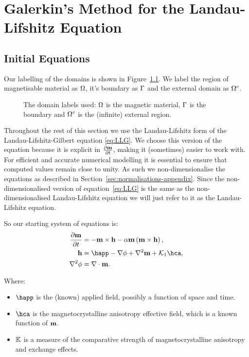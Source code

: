 
\chapter{Galerkin's Method for the Landau-Lifshitz Equation}
\label{sec:galerk-meth-ll}

\section{Initial Equations}

Our labelling of the domains is shown in Figure~\ref{fig:domain_labels}. We label the region of magnetisable material as $\Omega$, it's boundary as ${\Gamma}$ and the external domain as ${\Omega^c}$.

\begin{figure}[!ht]
  \center
  \caption{The domain labels used: $\Omega$ is the magnetic material, ${\Gamma}$ is the boundary and ${\Omega^c}$ is the (infinite) external region.} \label{fig:domain_labels}
\end{figure}

Throughout the rest of this section we use the Landau-Lifshitz form of the Landau-Lifshitz-Gilbert equation \eqref{eq:LLG}.
We choose this version of the equation because it is explicit in $\frac{\partial \mathbf{m}}{\partial t}$, making it (sometimes) easier to work with.
For efficient and accurate numerical modelling it is essential to ensure that computed values remain close to unity.
As such we non-dimensionalise the equations as described in Section~\ref{sec:normalisations-appendix}.
Since the non-dimensionalised version of equation~\eqref{eq:LLG} is the same as the non-dimensionalised Landau-Lifshitz equation we will just refer to it as the Landau-Lifshitz equation.

So our starting system of equations is:
\begin{align}
  \dmdt &= -\mxh -\dampc \mxmxh, \label{eq:ndll} \\
  \hv &= \happ - \nabla \phi + \lap \mv + \kone \hca, \label{eq:ndh} \\
  \lap \phi &= \nabla \cdot \mv. \label{eq:ndphi}
\end{align}

Where:
\begin{itemize}
\item $\happ$ is the (known) applied field, possibly a function of space and time.
\item $\hca$ is the magnetocrystalline anisotropy effective field, which is a known function of $\mathbf{m}$.
\item $\mathbb{K}$ is a measure of the comparative strength of magnetocrystalline anisotropy and exchange effects.
\end{itemize}

